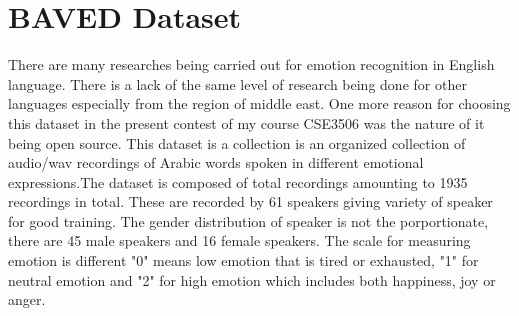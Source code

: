 \documentclass[11pt,a4paper]{article}
\begin{document}
	\section{BAVED Dataset}
	There are many researches being carried out for emotion recognition in English language. There is a lack of the same level of research being done for other languages especially from the region of middle east. One more reason for choosing this dataset in the present contest of my course CSE3506 was the nature of it being open source.  This dataset is a collection is an organized collection of audio/wav recordings of Arabic words spoken in different emotional expressions.The dataset is composed of total recordings amounting to 1935 recordings in total. These are recorded by 61 speakers giving variety of speaker for good training. The gender distribution of speaker is not the porportionate, there are 45 male speakers and 16 female speakers.  The scale for measuring emotion is different "0" means low emotion that is tired or exhausted, "1" for neutral emotion and "2" for high emotion which includes both happiness, joy or anger.
\end{document}
